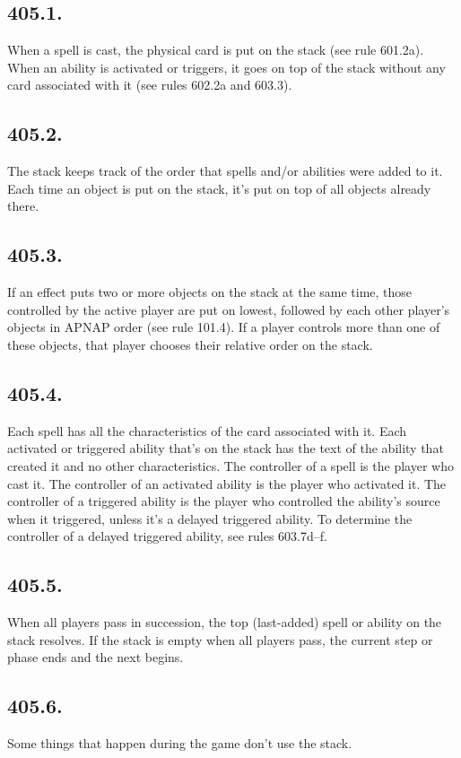 \subsection*{405.1.}
When a spell is cast, the physical card is put on the stack (see rule 601.2a). When an ability is activated or triggers, it goes on top of the stack without any card associated with it (see rules 602.2a and 603.3).

\subsection*{405.2.}
The stack keeps track of the order that spells and/or abilities were added to it. Each time an object is put on the stack, it’s put on top of all objects already there.

\subsection*{405.3.}
If an effect puts two or more objects on the stack at the same time, those controlled by the active player are put on lowest, followed by each other player’s objects in APNAP order (see rule 101.4). If a player controls more than one of these objects, that player chooses their relative order on the stack.

\subsection*{405.4.}
Each spell has all the characteristics of the card associated with it. Each activated or triggered ability that’s on the stack has the text of the ability that created it and no other characteristics. The controller of a spell is the player who cast it. The controller of an activated ability is the player who activated it. The controller of a triggered ability is the player who controlled the ability’s source when it triggered, unless it’s a delayed triggered ability. To determine the controller of a delayed triggered ability, see rules 603.7d–f.

\subsection*{405.5.}
When all players pass in succession, the top (last-added) spell or ability on the stack resolves. If the stack is empty when all players pass, the current step or phase ends and the next begins.

\subsection*{405.6.}
Some things that happen during the game don’t use the stack.

